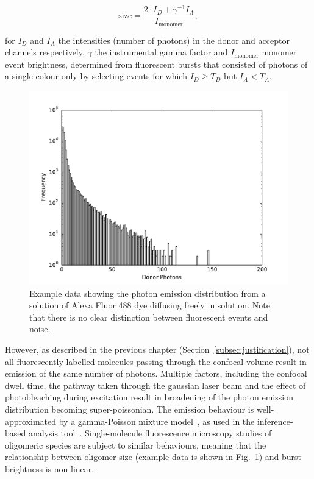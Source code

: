 \begin{equation}
\text{size} = \frac{2\cdot I_D + \gamma^{-1} I_A}{I_{\text{monomer}}},
\label{eq:size_linear}
\end{equation}

for $I_D$ and $I_A$ the intensities (number of photons) in the donor and acceptor channels respectively, $\gamma$ the instrumental gamma factor and $I_{\text{monomer}}$ monomer event brightness, determined from fluorescent bursts that consisted of photons of a single colour only by selecting events for which $I_D \geq T_D$ but $I_A < T_A$.

\begin{figure}
   \begin{center}
      \includegraphics*[clip=true, width=5in]{sizing/data_blue_dye_sample.pdf}
      \caption{Example data showing the photon emission distribution from a solution of Alexa Fluor 488 dye diffusing freely in solution. Note that there is no clear distinction between fluorescent events and noise.}
      \label{fig:example_monomer_emission}
   \end{center}
\end{figure}


However, as described in the previous chapter (Section~\ref{subsec:justification}), not all fluorescently labelled molecules passing through the confocal volume result in emission of the same number of photons. Multiple factors, including the confocal dwell time, the pathway taken through the gaussian laser beam and the effect of photobleaching during excitation result in broadening of the photon emission distribution becoming super-poissonian. The emission behaviour is well-approximated by a gamma-Poisson mixture model~\cite{chen1999}, as used in the inference-based analysis tool~\cite{murphy14}. Single-molecule fluorescence microscopy studies of oligomeric species are subject to similar behaviours, meaning that the relationship between oligomer size (example data is shown in Fig.~\ref{fig:example_monomer_emission}) and burst brightness is non-linear. 

